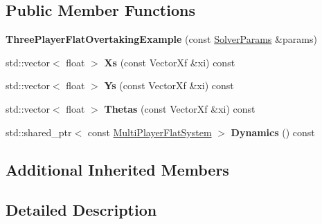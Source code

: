 \subsection*{Public Member Functions}
\begin{DoxyCompactItemize}
\item 
{\bfseries Three\+Player\+Flat\+Overtaking\+Example} (const \hyperlink{structilqgames_1_1_solver_params}{Solver\+Params} \&params)\hypertarget{classilqgames_1_1_three_player_flat_overtaking_example_a00b990b6c29657cb1516fd8132884036}{}\label{classilqgames_1_1_three_player_flat_overtaking_example_a00b990b6c29657cb1516fd8132884036}

\item 
std\+::vector$<$ float $>$ {\bfseries Xs} (const Vector\+Xf \&xi) const \hypertarget{classilqgames_1_1_three_player_flat_overtaking_example_a47a85425d31dd4a5e4d4534b9ff50c83}{}\label{classilqgames_1_1_three_player_flat_overtaking_example_a47a85425d31dd4a5e4d4534b9ff50c83}

\item 
std\+::vector$<$ float $>$ {\bfseries Ys} (const Vector\+Xf \&xi) const \hypertarget{classilqgames_1_1_three_player_flat_overtaking_example_ad4c1ae9db31f1f25c71187692d94b05d}{}\label{classilqgames_1_1_three_player_flat_overtaking_example_ad4c1ae9db31f1f25c71187692d94b05d}

\item 
std\+::vector$<$ float $>$ {\bfseries Thetas} (const Vector\+Xf \&xi) const \hypertarget{classilqgames_1_1_three_player_flat_overtaking_example_a92be7f8ef2b6ee6e6ac4339a32a30991}{}\label{classilqgames_1_1_three_player_flat_overtaking_example_a92be7f8ef2b6ee6e6ac4339a32a30991}

\item 
std\+::shared\+\_\+ptr$<$ const \hyperlink{classilqgames_1_1_multi_player_flat_system}{Multi\+Player\+Flat\+System} $>$ {\bfseries Dynamics} () const \hypertarget{classilqgames_1_1_three_player_flat_overtaking_example_a33fb0ea831db32f859718c7a54d80c6f}{}\label{classilqgames_1_1_three_player_flat_overtaking_example_a33fb0ea831db32f859718c7a54d80c6f}

\end{DoxyCompactItemize}
\subsection*{Additional Inherited Members}


\subsection{Detailed Description}


